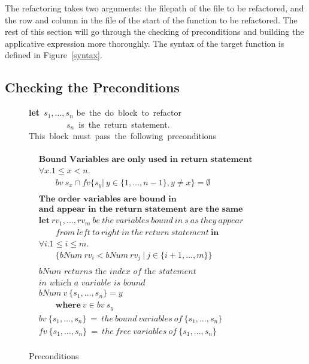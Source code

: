 The refactoring takes two arguments: the filepath of the file to be refactored, and the row and column in the file of the start of the function to be refactored. The rest of this section will go through the checking of preconditions and building the applicative expression more thoroughly. The syntax of the target function is defined in Figure~\ref{syntax}.



\subsection{Checking the Preconditions}

\begin{figure}[t]
\textbf{let}\ $s_1, \ldots, s_n$ be\ the\ do\ block\ to\ refactor\\
\ ~\ ~\ ~\ ~\       $s_n$\ is\ the\ return\ statement.\\
This\ block\ must\ pass\ the\ following\ preconditions\\
\\
\begin{math}
\begin{aligned}  	
&\textbf{Bound Variables are only used in return statement}\\
&\forall x.1\leq x < n.&\\
&\qquad bv\ s_x \cap fv \{s_y |\ y \in \{1, \ldots, n-1\}, y \neq x\} = \emptyset \\
\\
&\textbf{The order variables are bound in}\\
&\textbf{and appear in the return statement are the same}\\
&\textbf{let}\ rv_1, \ldots, rv_m\ be\ the\ variables\ bound\ in\ s\ as\ they\ appear&\\
&\qquad from\ left\ to\ right\ in\ the\ return\ statement\ \textbf{in}&\\
&\forall i. 1 \leq i \leq m .&\\
&\qquad \{bNum\ rv_i < bNum\ rv_j\ |\ j \in \{i+1, \ldots, m\} \}&\\
\\
&\textit{bNum returns the index of the statement}\\ 
&\textit{in which a variable is bound}\\
&bNum\ v\ \{s_1, \ldots, s_n \} = y &\\
&\qquad \textbf{where}\ v \in bv\ s_y&\\ 
&bv\ \{s_1, \ldots, s_n \}\ =\ the\ bound\ variables\ of\ \{s_1, \ldots, s_n\}\\
&fv\ \{s_1, \ldots, s_n \}\ =\ the\ free\ variables\ of\ \{s_1, \ldots, s_n\}\\&
		\end{aligned}
	\end{math}
	\caption{Preconditions}
	\label{preconditions}
\end{figure}

